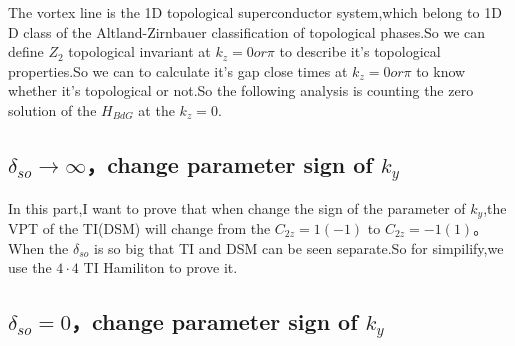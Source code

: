 \documentclass[5pt]{article}
\begin{document}
The vortex line is the 1D topological superconductor system,which belong to 1D D class of the Altland-Zirnbauer classification of topological phases.So we can define $Z_2$ topological invariant at $k_z=0 or \pi$ to describe it's topological properties.So we can to calculate it's gap close times at $k_z=0 or \pi$ to know whether it's topological or not.So the following analysis is counting the zero solution of the $H_{BdG}$ at the $k_z=0$.
\subsection{$\delta_{so}\rightarrow \infty$，change parameter sign of $k_y$}
In this part,I want to prove that when change the sign of the parameter of $k_y$,the VPT of the TI(DSM) will change from the $C_{2z}=1(-1)$ to $C_{2z}=-1(1)$。When the $\delta_{so}$ is so big that TI and DSM can be seen separate.So for simpilify,we use the $4\cdot 4$ TI Hamiliton to prove it.




\subsection{$\delta_{so}=0$，change parameter sign of $k_y$}

\newpage


\end{document}
